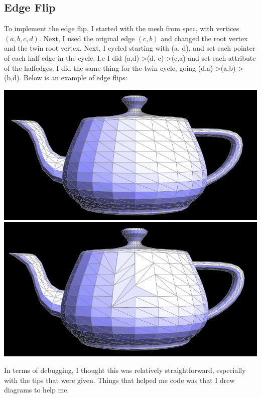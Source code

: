 \documentclass{article}
\begin{document}
\subsection{Edge Flip}
To implement the edge flip, I started with the mesh from spec, with vertices $(a, b, c, d)$. Next, I used the original edge $(c, b)$ and changed the root vertex and the twin root vertex. Next, I cycled starting with (a, d), and set each pointer of each half edge in the cycle. I.e I did (a,d)->(d, c)->(c,a) and set each attribute of the halfedges. I did the same thing for the twin cycle, going (d,a)->(a,b)->(b,d). Below is an example of edge flips:
\begin{center}
    \includegraphics[]{Part 4/before.png}
    \includegraphics[]{Part 4/edgeflips.png}
\end{center}
In terms of debugging, I thought this was relatively straightforward, especially with the tips that were given. Things that helped me code was that I drew diagrams to help me.
\end{document}
